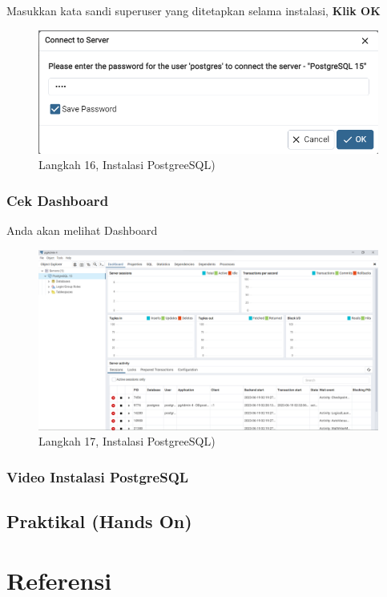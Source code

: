 \documentclass[
]{book}
\begin{document}
Masukkan kata sandi superuser yang ditetapkan selama instalasi, \textbf{Klik OK}

\begin{figure}

{\centering \includegraphics[width=1\linewidth]{./images/Bab1/Postgree15} 

}

\caption{Langkah 16, Instalasi PostgreeSQL)}\label{fig:install-posrgree16}
\end{figure}

\hypertarget{cek-dashboard}{%
\subsection{Cek Dashboard}\label{cek-dashboard}}

Anda akan melihat Dashboard

\begin{figure}

{\centering \includegraphics[width=1\linewidth]{./images/Bab1/Postgree16} 

}

\caption{Langkah 17, Instalasi PostgreeSQL)}\label{fig:install-posrgree17}
\end{figure}

\hypertarget{video-instalasi-postgresql}{%
\subsection{Video Instalasi PostgreSQL}\label{video-instalasi-postgresql}}

\hypertarget{praktikal-hands-on}{%
\section{Praktikal (Hands On)}\label{praktikal-hands-on}}

\hypertarget{referensi}{%
\chapter{Referensi}\label{referensi}}

  
\end{document}
